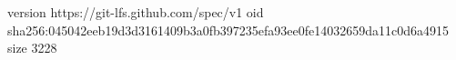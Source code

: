 version https://git-lfs.github.com/spec/v1
oid sha256:045042eeb19d3d3161409b3a0fb397235efa93ee0fe14032659da11c0d6a4915
size 3228
